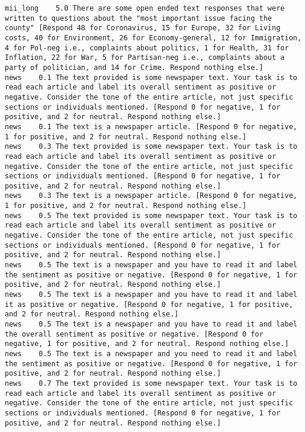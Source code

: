 \begin{lstlisting}[label=lst:promptvariants]
mii_long	5.0	There are some open ended text responses that were written to questions about the "most important issue facing the county" [Respond 48 for Coronavirus, 15 for Europe, 32 for Living costs, 40 for Environment, 26 for Economy-general, 12 for Immigration, 4 for Pol-neg i.e., complaints about politics, 1 for Health, 31 for Inflation, 22 for War, 5 for Partisan-neg i.e., complaints about a party of politician, and 14 for Crime. Respond nothing else.]
news	0.1	The text provided is some newspaper text. Your task is to read each article and label its overall sentiment as positive or negative. Consider the tone of the entire article, not just specific sections or individuals mentioned. [Respond 0 for negative, 1 for positive, and 2 for neutral. Respond nothing else.]
news	0.1	The text is a newspaper article. [Respond 0 for negative, 1 for positive, and 2 for neutral. Respond nothing else.]
news	0.3	The text provided is some newspaper text. Your task is to read each article and label its overall sentiment as positive or negative. Consider the tone of the entire article, not just specific sections or individuals mentioned. [Respond 0 for negative, 1 for positive, and 2 for neutral. Respond nothing else.]
news	0.3	The text is a newspaper article. [Respond 0 for negative, 1 for positive, and 2 for neutral. Respond nothing else.]
news	0.5	The text provided is some newspaper text. Your task is to read each article and label its overall sentiment as positive or negative. Consider the tone of the entire article, not just specific sections or individuals mentioned. [Respond 0 for negative, 1 for positive, and 2 for neutral. Respond nothing else.]
news	0.5	The text is a newspaper and you have to read it and label the sentiment as positive or negative. [Respond 0 for negative, 1 for positive, and 2 for neutral. Respond nothing else.]
news	0.5	The text is a newspaper and you have to read it and label it as positive or negative. [Respond 0 for negative, 1 for positive, and 2 for neutral. Respond nothing else.]
news	0.5	The text is a newspaper and you have to read it and label the overall sentiment as positive or negative. [Respond 0 for negative, 1 for positive, and 2 for neutral. Respond nothing else.]
news	0.5	The text is a newspaper and you need to read it and label the sentiment as positive or negative. [Respond 0 for negative, 1 for positive, and 2 for neutral. Respond nothing else.]
news	0.7	The text provided is some newspaper text. Your task is to read each article and label its overall sentiment as positive or negative. Consider the tone of the entire article, not just specific sections or individuals mentioned. [Respond 0 for negative, 1 for positive, and 2 for neutral. Respond nothing else.]

\end{lstlisting}
